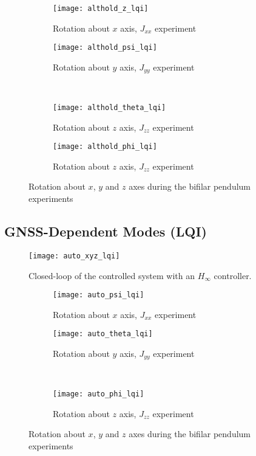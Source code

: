 \begin{figure}[H]
\begin{subfigure}{.5\linewidth}
\centering
\texttt{[image: althold\_z\_lqi]}
\caption{Rotation about $x$ axis, $J_{xx}$ experiment}
\label{fig:althold_z_lqi}
\end{subfigure}%
\begin{subfigure}{.5\linewidth}
\centering
\texttt{[image: althold\_psi\_lqi]}
\caption{Rotation about $y$ axis, $J_{yy}$ experiment}
\label{fig:althold_psi_lqi}
\end{subfigure}\\[1ex]
\begin{subfigure}{0.5\linewidth}
\centering
\texttt{[image: althold\_theta\_lqi]}
\caption{Rotation about $z$ axis, $J_{zz}$ experiment}
\label{fig:althold_theta_lqi}
\end{subfigure}
\begin{subfigure}{0.5\linewidth}
\centering
\texttt{[image: althold\_phi\_lqi]}
\caption{Rotation about $z$ axis, $J_{zz}$ experiment}
\label{fig:althold_phi_lqi}
\end{subfigure}
\caption{Rotation about $x$, $y$ and $z$ axes during the bifilar pendulum experiments}
\label{fig:althold_lqi}
\end{figure}


\subsection{GNSS-Dependent Modes (LQI)}

\begin{figure}[h]
	\begin{center}
	\texttt{[image: auto\_xyz\_lqi]}
	\caption{Closed-loop of the controlled system with an $H_{\infty}$ controller.}
	\label{fig:auto_xyz_lqi}
	\end{center}
	\end{figure}
	
\begin{figure}[H]
\begin{subfigure}{.5\linewidth}
\centering
\texttt{[image: auto\_psi\_lqi]}
\caption{Rotation about $x$ axis, $J_{xx}$ experiment}
\label{fig:auto_psi_lqi}
\end{subfigure}%
\begin{subfigure}{.5\linewidth}
\centering
\texttt{[image: auto\_theta\_lqi]}
\caption{Rotation about $y$ axis, $J_{yy}$ experiment}
\label{fig:auto_theta_lqi}
\end{subfigure}\\[1ex]
\begin{subfigure}{\linewidth}
\centering
\texttt{[image: auto\_phi\_lqi]}
\caption{Rotation about $z$ axis, $J_{zz}$ experiment}
\label{fig:auto_psi_lqi}
\end{subfigure}
\caption{Rotation about $x$, $y$ and $z$ axes during the bifilar pendulum experiments}
\label{fig:auto_lqi}
\end{figure}

